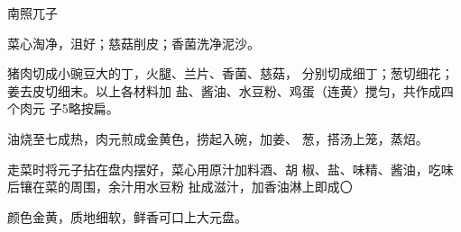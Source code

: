 \begin{recipe}{南照兀子}

\ingredients





\cooking

\step 菜心淘净，沮好；慈菇削皮；香菌洗净泥沙。

\step 猪肉切成小豌豆大的丁，火腿、兰片、香菌、慈菇， 分别切成细丁；葱切细花；姜去皮切细末。以上各材料加 盐、酱油、水豆粉、鸡蛋（连黄〉搅匀，共作成四个肉元 子5略按扁。

\step 油烧至七成热，肉元煎成金黄色，捞起入碗，加姜、 葱，搭汤上笼，蒸炤。

\step 走菜时将元子拈在盘内摆好，菜心用原汁加料酒、胡 椒、盐、味精、酱油，吃味后镶在菜的周围，余汁用水豆粉 扯成滋汁，加香油淋上即成〇

\notes

颜色金黄，质地细软，鲜香可口上大元盘。

\end{recipe}

